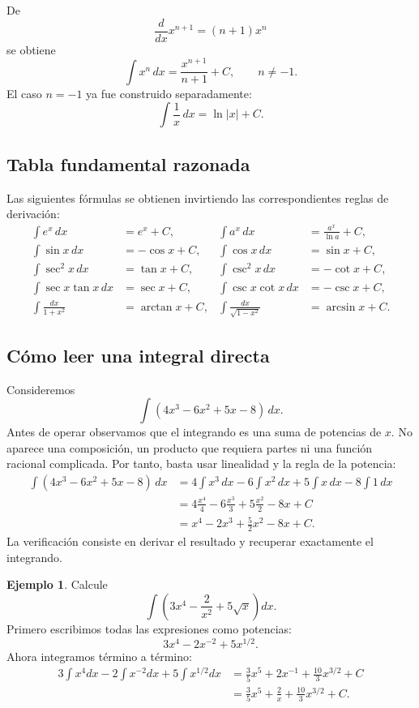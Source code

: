 \documentclass[12pt]{article}
\theoremstyle{definition}
\newtheorem{ejemplo}[teorema]{Ejemplo}
\theoremstyle{remark}
\begin{document}
De
\[
\frac{d}{dx}x^{n+1}=(n+1)x^n
\]
se obtiene
\[
\boxed{\int x^n\,dx=\frac{x^{n+1}}{n+1}+C,\qquad n\neq-1.}
\]
El caso $n=-1$ ya fue construido separadamente:
\[
\boxed{\int\frac1x\,dx=\ln|x|+C.}
\]

\subsection*{Tabla fundamental razonada}
Las siguientes fórmulas se obtienen invirtiendo las correspondientes reglas de derivación:
\begin{align*}
\int e^x\,dx&=e^x+C,&
\int a^x\,dx&=\frac{a^x}{\ln a}+C,\\
\int\sin x\,dx&=-\cos x+C,&
\int\cos x\,dx&=\sin x+C,\\
\int\sec^2x\,dx&=\tan x+C,&
\int\csc^2x\,dx&=-\cot x+C,\\
\int\sec x\tan x\,dx&=\sec x+C,&
\int\csc x\cot x\,dx&=-\csc x+C,\\
\int\frac{dx}{1+x^2}&=\arctan x+C,&
\int\frac{dx}{\sqrt{1-x^2}}&=\arcsin x+C.
\end{align*}

\subsection*{Cómo leer una integral directa}
Consideremos
\[
\int(4x^3-6x^2+5x-8)\,dx.
\]
Antes de operar observamos que el integrando es una suma de potencias de $x$. No aparece una composición, un producto que requiera partes ni una función racional complicada. Por tanto, basta usar linealidad y la regla de la potencia:
\begin{align*}
\int(4x^3-6x^2+5x-8)\,dx
&=4\int x^3\,dx-6\int x^2\,dx+5\int x\,dx-8\int1\,dx\\
&=4\frac{x^4}{4}-6\frac{x^3}{3}+5\frac{x^2}{2}-8x+C\\
&=\boxed{x^4-2x^3+\frac52x^2-8x+C}.
\end{align*}
La verificación consiste en derivar el resultado y recuperar exactamente el integrando.

\begin{ejemplo}
Calcule
\[
\int\left(3x^4-\frac2{x^2}+5\sqrt{x}\right)dx.
\]
Primero escribimos todas las expresiones como potencias:
\[
3x^4-2x^{-2}+5x^{1/2}.
\]
Ahora integramos término a término:
\begin{align*}
3\int x^4dx-2\int x^{-2}dx+5\int x^{1/2}dx
&=\frac35x^5+2x^{-1}+\frac{10}{3}x^{3/2}+C\\
&=\boxed{\frac35x^5+\frac2x+\frac{10}{3}x^{3/2}+C}.
\end{align*}
\end{ejemplo}
\end{document}
